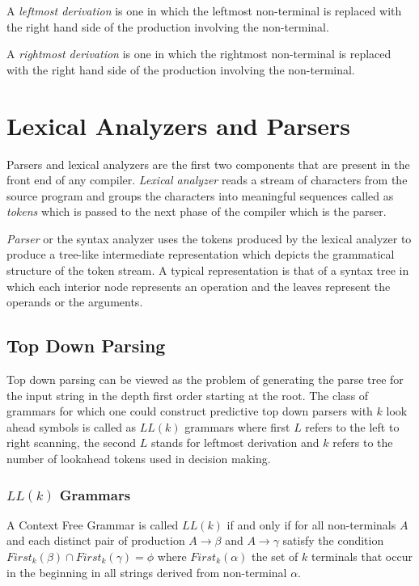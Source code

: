 \documentclass[oneside]{book}
\begin{document}
A \textit{leftmost derivation} is one in which the leftmost non-terminal is replaced with the right hand side of the production involving the non-terminal.

A \textit{rightmost derivation} is one in which the rightmost non-terminal is replaced with the right hand side of the production involving the non-terminal.

\section{Lexical Analyzers and Parsers}
 Parsers and lexical analyzers are the first two components that are present in the front end of any compiler. \textit{Lexical analyzer} reads a stream of characters from the source program and groups the characters into meaningful sequences called as \textit{tokens} which is passed to the next phase of the compiler which is the parser.  

\textit{Parser} or the syntax analyzer uses the tokens produced by the lexical analyzer to produce a tree-like intermediate representation which depicts the grammatical structure of the token stream. A typical representation is that of a syntax tree in which each interior node represents an operation and the leaves represent the operands or the arguments.

\subsection{Top Down Parsing}
 Top down parsing can be viewed as the problem of generating the parse tree for the input string in the depth first order starting at the root. The class of grammars for which one could construct predictive top down parsers with $k$ look ahead symbols is called as $LL(k)$ grammars where first $L$ refers to the left to right scanning, the second $L$ stands for leftmost derivation and $k$ refers to the number of lookahead tokens used in decision making.
 
 \subsubsection*{$LL(k)$ Grammars}
 A Context Free Grammar is called $LL(k)$ if and only if for all non-terminals $A$ and each distinct pair of production $A \rightarrow \beta$ and $A \rightarrow \gamma$ satisfy the condition $First_k(\beta) \cap First_k(\gamma) = \phi$ where $First_k(\alpha)$ the set of $k$ terminals that occur in the beginning in all strings derived from non-terminal $\alpha$.
 
\end{document}
